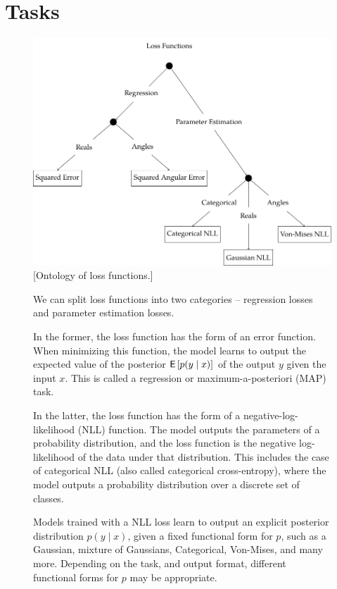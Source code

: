 \section{Tasks}
\label{s:tasks}

\begin{figure}[h]
    \centering
        \includegraphics[width=.7\linewidth]{figures/ontology-1-loss.pdf}
        \vspace{1cm}
        \captionsetup{parskip=7pt}
        [Ontology of loss functions.]{We can split loss functions into two categories -- regression losses and parameter estimation losses.

        In the former, the loss function has the form of an error function. When minimizing this function, the model learns to output the expected value of the posterior $\mathsf{E}\left[p(y \mid x)\right]$ of the output $y$ given the input $x$. This is called a regression or maximum-a-posteriori (MAP) task.

        In the latter, the loss function has the form of a negative-log-likelihood (NLL) function. The model outputs the parameters of a probability distribution, and the loss function is the negative log-likelihood of the data under that distribution. This includes the case of categorical NLL (also called categorical cross-entropy), where the model outputs a probability distribution over a discrete set of classes.

        Models trained with a NLL loss learn to output an explicit posterior distribution $p(y \mid x)$, given a fixed functional form for $p$, such as a Gaussian, mixture of Gaussians, Categorical, Von-Mises, and many more. Depending on the task, and output format, different functional forms for $p$ may be appropriate.}
        \label{fig:ontology-loss}
\end{figure}

